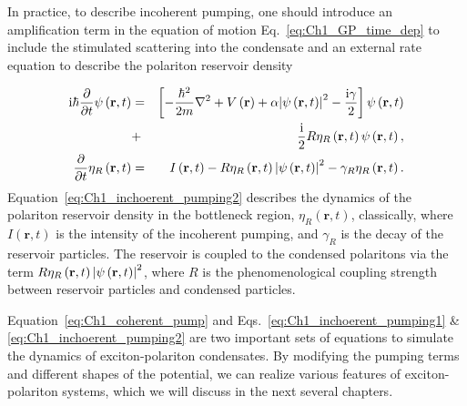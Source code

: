 In practice, to describe incoherent pumping, one should introduce an amplification term in the equation of motion Eq.~\eqref{eq:Ch1_GP_time_dep} to include the stimulated scattering into the condensate and an external rate equation to describe the polariton reservoir density

%
\begin{eqnarray}
        \mathrm{i}\hbar \frac{\partial}{\partial t} \psi\left(\mathbf{r},t\right) &=& \left[ -\frac{\hbar^2}{2m}\nabla^2 + V\left(\mathbf{r}\right) + \alpha \abs{\psi\left(\mathbf{r},t\right)}^2 -\frac{\mathrm{i} \gamma}{2} \right] \psi\left(\mathbf{r},t\right)\nonumber \\ &+& \frac{\mathrm{i}}{2}R\eta_R\left(\mathbf{r},t\right) \psi\left(\mathbf{r},t\right),
        \label{eq:Ch1_inchoerent_pumping1}\\
        \frac{\partial}{\partial t} \eta_R\left(\mathbf{r},t\right) &=& I\left(\mathbf{r},t\right) - R \eta_R\left(\mathbf{r},t\right) \abs{\psi\left(\mathbf{r},t\right)}^2 - \gamma_R \eta_R \left(\mathbf{r},t\right).
        \label{eq:Ch1_inchoerent_pumping2}
\end{eqnarray}
%
Equation~\eqref{eq:Ch1_inchoerent_pumping2} describes the dynamics of the polariton reservoir density in the bottleneck region, $\eta_R\left(\mathbf{r},t\right)$, classically, where $I\left(\mathbf{r},t\right)$ is the intensity of the incoherent pumping, and $\gamma_R$ is the decay of the reservoir particles.
The reservoir is coupled to the condensed polaritons via the term $R\eta_R \left(\mathbf{r},t\right)\abs{\psi\left(\mathbf{r},t\right)}^2$, where $R$ is the phenomenological coupling strength between reservoir particles and condensed particles.

Equation~\eqref{eq:Ch1_coherent_pump} and Eqs.~\eqref{eq:Ch1_inchoerent_pumping1} \& \eqref{eq:Ch1_inchoerent_pumping2} are two important sets of equations to simulate the dynamics of exciton-polariton condensates.
By modifying the pumping terms and different shapes of the potential, we can realize various features of exciton-polariton systems, which we will discuss in the next several chapters.

